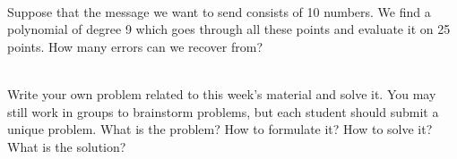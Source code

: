 \documentclass[]{article}
\newif\ifsolutions
\renewcommand{\answer}[1]{{\color{mydarkblue}\textbf{Solution:}#1}}
\begin{document}
\begin{qunlist}
{{}}\fi



 \\ %
Suppose that the message we want to send consists of 10 numbers. We find a polynomial of degree 9 which goes through all these points and evaluate it on 25 points. How many errors can we recover from?

\ifsolutions{ \answer {
For $ k $ erasure errors, we need to send $ k $ additional packets for a total of $ n+k $. Here, $ n=10 $ and $ n+k=25 $, so we can recover from 15 erasure errors.

For $ k $ general errors, we need $ 2k $ additional packets. We have 15 additional packets, so we may recover from $ \lfloor 15/2 \rfloor = 7 $ general errors.
}}\fi



 \\
Write your own problem related to this week's material and solve it. You may still work in groups to brainstorm problems, but each student should submit a unique problem. What is the problem? How to formulate it? How to solve it? What is the solution?
  
  
    
\end{qunlist}
\end{document}
